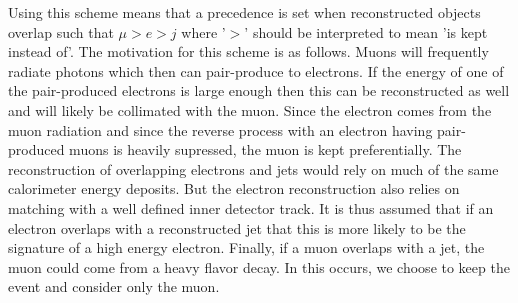 Using this scheme means that a precedence is set when 
reconstructed objects overlap such that $\mu > e > j$ where '$>$' should
be interpreted to mean 'is kept instead of'. The motivation for this scheme
is as follows. Muons will frequently radiate photons which then can pair-produce
to electrons.  If the energy of one of the pair-produced electrons is 
large enough then this can be reconstructed as well and will likely be collimated
with the muon.  Since the electron comes from the muon radiation and
since the reverse process with an electron having pair-produced muons
is heavily supressed, the muon is kept preferentially.  The reconstruction
of overlapping electrons and jets
would rely on much of the same calorimeter energy deposits.  But the electron
reconstruction also relies on matching with a well defined inner detector
track.  It is thus assumed that if an electron overlaps with a reconstructed
jet that this is more likely to be the signature of a high energy electron.
Finally, if a muon overlaps with a jet, the muon could come from a heavy flavor 
decay. In this occurs, we choose to keep the event and consider only the muon.


